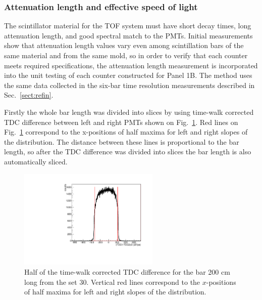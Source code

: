 \subsubsection{Attenuation length and effective speed of light}
\label{sect:att_speed}


The scintillator material for the TOF system must have short decay times, long attenuation
length, and good spectral match to the PMTs. Initial measurements show that attenuation
length values vary even among scintillation bars of the same material and from the
same mold, so in order to verify that each counter meets required specifications, the attenuation
length measurement is incorporated into the unit testing of each counter constructed
for Panel 1B. The method uses the same data collected in the six-bar time resolution
measurements described in Sec.~\ref{sect:refin}.	

Firstly the whole bar length was divided into slices by using time-walk corrected TDC difference between left and right PMTs shown on Fig.~\ref{fig:tdc_diff}. Red lines on Fig.~\ref{fig:tdc_diff} correspond to the x-positions of half maxima for left and right slopes of the distribution. The distance between these lines is proportional to the bar length, so after the TDC difference was divided into slices the bar length is also automatically sliced.


\begin{figure}[]
\centering
\includegraphics[width=0.6\textwidth]{gleb/fig_gleb_att_length/tdc_diff.pdf}
\caption{Half of the time-walk corrected TDC difference for the bar 200 cm long from the set 30. Vertical red lines correspond to the $x$-positions of half maxima for left and right slopes of the distribution.\label{fig:tdc_diff}}
\end{figure}


